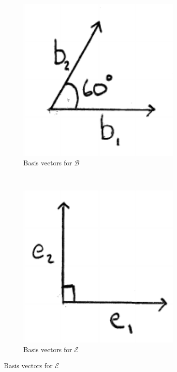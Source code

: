 \documentclass[12pt,letter]{article}
\begin{document}
\begin{figure}[h]
	\centering
	\caption{Basis Vectors}
	\begin{subfigure}[h]{0.25\textwidth}
		\centering
		\includegraphics[width = 0.9\textwidth]{basis_b.pdf}
		\caption{Basis vectors for $\mathcal{B}$}
		\label{fig:basis_b}
	\end{subfigure}
	~
	\begin{subfigure}[h]{0.25\textwidth}
		\centering
		\includegraphics[width = 0.9\textwidth]{basis_e.pdf}
		\caption{Basis vectors for $\mathcal{E}$}
		\label{fig:basis_e}
	\end{subfigure}
	\label{fig:basis_vectors}
\end{figure}
\end{document}
